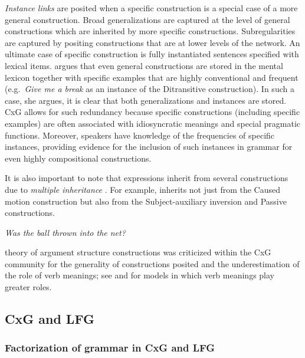 \documentclass[output=paper,japanesefont,hidelinks]{langscibook}
\begin{document}
\textit{Instance links} are posited when a specific construction is a special case of a more general construction. Broad generalizations are captured at the level of general constructions which are inherited by more specific constructions. Subregularities are captured by positing constructions that are at lower levels of the network. An ultimate case of specific construction is fully instantiated sentences specified with lexical items. \citet[55]{Goldberg2006} argues that even general constructions are stored in the mental lexicon together with specific examples that are highly conventional and frequent (e.g.\ \textit{Give me a break} as an instance of the Ditransitive construction). In such a case, she argues, it is clear that both generalizations and instances are stored. CxG allows for such redundancy because specific constructions (including specific examples) are often associated with idiosyncratic meanings and special pragmatic functions. Moreover, speakers have knowledge of the frequencies of specific instances, providing evidence for the inclusion of such instances in grammar for even highly compositional constructions.  

It is also important to note that expressions inherit from several constructions due to \textit{multiple inheritance} \citep{goldberg1995constructions,Goldberg2003}. For example,  inherits not just from the Caused motion construction but also from the Subject-auxiliary inversion and Passive constructions.

\ea%
    \label{ex:cg:3}
\textit{Was the ball thrown into the net?} 
    \z

          

 theory of argument structure constructions was criticized within the CxG community for the generality of constructions posited and the underestimation of the role of verb meanings; see \citet{Boas2003} and \citet{Iwata2008,Iwata2020} for models in which verb meanings play greater roles. 

\subsection{\textbf{CxG} \textbf{and} \textbf{LFG}}
\label{sec:cg:2.2}

\subsubsection{Factorization of grammar in CxG and LFG}
\label{sec:cg:2.2.1}
\end{document}
